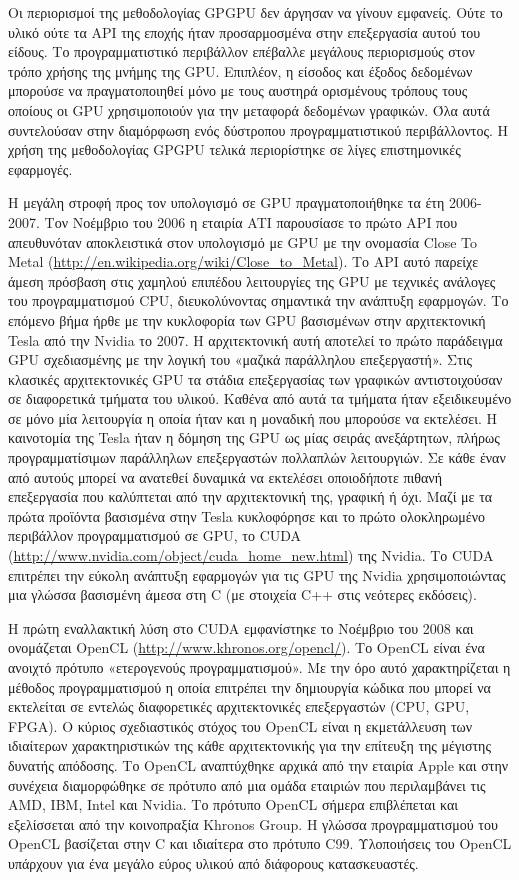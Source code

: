 Οι περιορισμοί της μεθοδολογίας GPGPU δεν άργησαν να γίνουν εμφανείς. Ούτε το υλικό ούτε τα API της εποχής ήταν προσαρμοσμένα στην επεξεργασία αυτού του είδους. Το προγραμματιστικό περιβάλλον επέβαλλε μεγάλους περιορισμούς στον τρόπο χρήσης της μνήμης της GPU. Επιπλέον, η είσοδος και έξοδος δεδομένων μπορούσε να πραγματοποιηθεί μόνο με τους αυστηρά ορισμένους τρόπους τους οποίους οι GPU χρησιμοποιούν για την μεταφορά δεδομένων γραφικών. Όλα αυτά συντελούσαν στην διαμόρφωση ενός δύστροπου προγραμματιστικού περιβάλλοντος. Η χρήση της μεθοδολογίας GPGPU τελικά περιορίστηκε σε λίγες επιστημονικές εφαρμογές.

Η μεγάλη στροφή προς τον υπολογισμό σε GPU πραγματοποιήθηκε τα έτη 2006-2007. Τον Νοέμβριο του 2006 η εταιρία ATI παρουσίασε το πρώτο API που απευθυνόταν αποκλειστικά στον υπολογισμό με GPU με την ονομασία Close To Metal (\url{http://en.wikipedia.org/wiki/Close_to_Metal}). Το API αυτό παρείχε άμεση πρόσβαση στις χαμηλού επιπέδου λειτουργίες της GPU με τεχνικές ανάλογες του προγραμματισμού CPU, διευκολύνοντας σημαντικά την ανάπτυξη εφαρμογών. Το επόμενο βήμα ήρθε με την κυκλοφορία των GPU βασισμένων στην αρχιτεκτονική Tesla από την Νvidia το 2007. Η αρχιτεκτονική αυτή αποτελεί το πρώτο παράδειγμα GPU σχεδιασμένης με την λογική του «μαζικά παράλληλου επεξεργαστή». Στις κλασικές αρχιτεκτονικές GPU τα στάδια επεξεργασίας των γραφικών αντιστοιχούσαν σε διαφορετικά τμήματα του υλικού. Καθένα από αυτά τα τμήματα ήταν εξειδικευμένο σε μόνο μία λειτουργία η οποία ήταν και η μοναδική που μπορούσε να εκτελέσει. Η καινοτομία της Tesla ήταν η δόμηση της GPU ως μίας σειράς ανεξάρτητων, πλήρως προγραμματίσιμων παράλληλων 
επεξεργαστών πολλαπλών λειτουργιών. Σε κάθε έναν από αυτούς μπορεί να  ανατεθεί δυναμικά να εκτελέσει οποιοδήποτε πιθανή επεξεργασία που καλύπτεται από την αρχιτεκτονική της, γραφική ή όχι. Μαζί με τα πρώτα προϊόντα βασισμένα στην Tesla κυκλοφόρησε και το πρώτο ολοκληρωμένο περιβάλλον προγραμματισμού σε GPU, το CUDA (\url{http://www.nvidia.com/object/cuda_home_new.html}) της Nvidia. Το CUDA επιτρέπει την εύκολη ανάπτυξη εφαρμογών για τις GPU της Nvidia χρησιμοποιώντας μια γλώσσα βασισμένη άμεσα στη C (με στοιχεία C++ στις νεότερες εκδόσεις).

Η πρώτη εναλλακτική λύση στο CUDA εμφανίστηκε το Νοέμβριο του 2008 και ονομάζεται OpenCL (\url{http://www.khronos.org/opencl/}). Το OpenCL είναι ένα ανοιχτό πρότυπο «ετερογενούς προγραμματισμού». Με την όρο αυτό χαρακτηρίζεται η μέθοδος προγραμματισμού η οποία επιτρέπει την δημιουργία κώδικα που μπορεί να εκτελείται σε εντελώς διαφορετικές αρχιτεκτονικές επεξεργαστών (CPU, GPU, FPGA). O κύριος σχεδιαστικός στόχος του OpenCL είναι η εκμετάλλευση των ιδιαίτερων χαρακτηριστικών της κάθε αρχιτεκτονικής για την επίτευξη της μέγιστης δυνατής απόδοσης. Το OpenCL αναπτύχθηκε αρχικά από την εταιρία Apple και στην συνέχεια διαμορφώθηκε σε πρότυπο από μια ομάδα εταιριών που περιλαμβάνει τις AMD, IBM, Intel και Nvidia. Το πρότυπο OpenCL σήμερα επιβλέπεται και εξελίσσεται από την κοινοπραξία Khronos Group. Η γλώσσα προγραμματισμού του OpenCL βασίζεται στην C και ιδιαίτερα στο πρότυπο C99. Υλοποιήσεις του OpenCL υπάρχουν για ένα μεγάλο εύρος υλικού από διάφορους κατασκευαστές.

